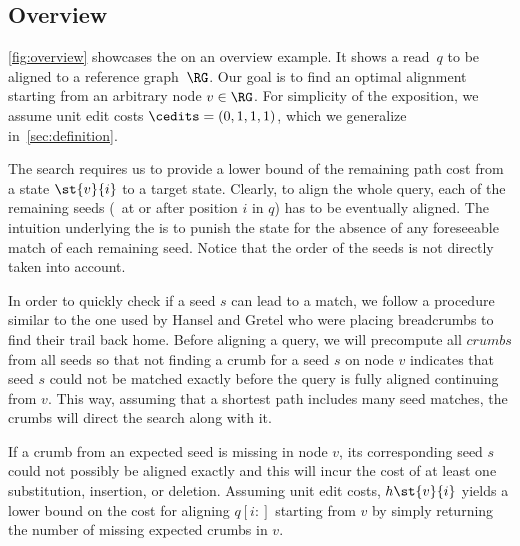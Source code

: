 

\subsection{Overview} \label{sec:overview}
\cref{fig:overview} showcases the \seedh on an overview example. It shows a
read~$q$ to be aligned to a reference graph~$\RG$. Our goal is to find an
optimal alignment starting from an arbitrary node $v \in \RG$.
%
For simplicity of the exposition, we assume unit edit costs $\cedits =
(0,1,1,1)$, which we generalize in~\cref{sec:definition}.

The \A search requires us to provide a lower bound of the remaining path cost
from a state $\st{v}{i}$ to a target state. Clearly, to align the whole query,
each of the remaining seeds (\ie~at or after position $i$ in $q$) has to be
eventually aligned. The intuition underlying the \seedh is to punish the state
for the absence of any foreseeable match of each remaining seed. Notice that the
order of the seeds is not directly taken into account.

In order to quickly check if a seed $s$ can lead to a match, we follow a
procedure similar to the one used by Hansel and Gretel who were placing
breadcrumbs to find their trail back home. Before aligning a query, we will
precompute all $\textit{crumbs}$ from all seeds so that not finding a crumb for
a seed $s$ on node $v$ indicates that seed $s$ could not be matched exactly
before the query is fully aligned continuing from $v$. This way, assuming that a
shortest path includes many seed matches, the crumbs will direct the \A search
along with it.

If a crumb from an expected seed is missing in node $v$, its corresponding seed
$s$ could not possibly be aligned exactly and this will incur the cost of at
least one substitution, insertion, or deletion. Assuming unit edit costs,
$h\st{v}{i}$ yields a lower bound on the cost for aligning $q[i{:}]$ starting
from $v$ by simply returning the number of missing expected crumbs in $v$.


